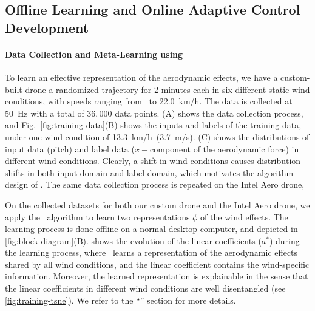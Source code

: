 \subsection*{Offline Learning and Online Adaptive Control Development}
\paragraph{Data Collection and Meta-Learning using \DAML} To learn an effective representation of the aerodynamic effects, we have a custom-built drone  a randomized trajectory for 2 minutes each in six different static wind conditions, with speeds ranging from \nowind~to \SI{22.0}{km/h}.  The data is collected at \SI{50}{Hz} with a total of $36,000$ data points. (A) shows the data collection process, and Fig.~\ref{fig:training-data}(B) shows the inputs and labels of the training data, under one wind condition of \SI{13.3}{km/h}~(\SI{3.7}{m/s}). (C) shows the distributions of input data (pitch) and label data ($x-$component of the aerodynamic force) in different wind conditions. Clearly, a shift in wind conditions causes distribution shifts in both input domain and label domain, which motivates the algorithm design of \DAML. The same data collection process is repeated on the Intel Aero drone, 

On the collected datasets for both our custom drone and the Intel Aero drone, we apply the \DAML~algorithm to learn two representations $\phi$ of the wind effects. The learning process is done offline on a normal desktop computer, and depicted in \cref{fig:block-diagram}(B).
 shows the evolution of the linear coefficients ($a^*$) during the learning process, where \DAML~learns a representation of the aerodynamic effects shared by all wind conditions, and the linear coefficient contains the wind-specific information. Moreover, the learned representation is explainable in the sense that the linear coefficients in different wind conditions are well disentangled (see \cref{fig:training-tsne}).
We refer to the ``'' section for more details.


